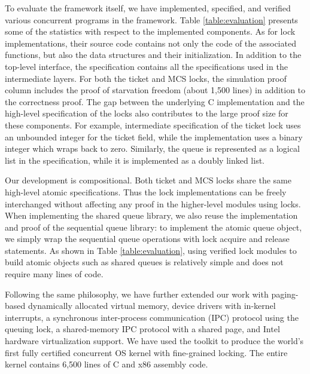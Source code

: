 To evaluate the framework itself, we have implemented, specified, and verified various
concurrent programs in the framework. Table \ref{table:evaluation} presents some of the
statistics with respect to the implemented components.
As for lock implementations,
their source code contains not only
the code of the associated functions,
but also the data structures and their initialization.
In addition to the top-level interface, the specification contains all the 
specifications used in the intermediate layers.
For both the ticket and MCS locks,
the simulation proof column
includes the proof of starvation freedom (about 1,500 lines) in addition to the correctness proof.
The gap between the underlying C implementation and the high-level specification of the locks
also contributes to the large proof size for these components.
For example, intermediate specification of the ticket lock uses an unbounded
integer for the ticket field,
while the implementation uses a binary integer
which wraps back to zero.
Similarly, the queue is represented as a logical list in the specification,
while it is implemented as a doubly linked list.

Our development is compositional. Both ticket  and MCS locks share the same
high-level atomic specifications.
Thus the lock implementations can be freely interchanged without affecting any proof
in the higher-level modules using locks. When implementing the shared queue library, we
also reuse the implementation and proof of the sequential queue library:
to implement the atomic queue object, we simply wrap the
sequential queue operations with lock acquire and release statements.
As shown in Table \ref{table:evaluation}, using verified lock modules to build
atomic objects such as shared queues is relatively simple and does not require
many lines of code.

Following the same philosophy, 
we have further extended our work with paging-based
dynamically allocated virtual
memory, device drivers with in-kernel interrupts, a synchronous inter-process
communication (IPC) protocol using the queuing lock, a shared-memory IPC protocol with
a shared page, and Intel hardware virtualization support.
We have used the toolkit to produce the world's
first fully certified concurrent OS kernel
with fine-grained locking. 
The entire kernel contains 6,500 lines
of C and x86 assembly code.


